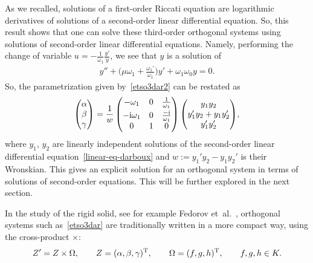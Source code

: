 \documentclass[10pt,a4paper]{amsart}
\numberwithin{equation}{section}
\begin{document}
\begin{Remark}\label{rmk-darboux-thm2}
As we recalled, solutions of a first-order Riccati equation are logarithmic derivatives of solutions of a second-order linear differential equation. So, this result shows that one can solve these third-order orthogonal systems using solutions of second-order linear differential equations.
Namely, performing the change of variable $u=-\frac{1}{\omega_1}\frac{y'}{y}$, we see that
$y$ is a solution of
\begin{gather}\label{linear-eq-darboux}
y''+\bigg( \mu \omega_1 + \frac{\omega_1'}{\omega_1}\bigg) y' + \omega_1 \omega_0 y = 0.
\end{gather}
So, the parametrization given by~\eqref{etso3dar2} can be restated as
\begin{gather*}
\begin{pmatrix}
\alpha \\ \beta \\ \gamma \end{pmatrix}	= \frac{1}{w}
\begin{pmatrix} - \omega_1 &0&{\frac {1}{\omega_{{1}}}}
\vspace{1mm}\\ -{\rm i}\omega_{{1}} &0&{\frac {-{\rm i}}{ \omega_{{1}} }}\\ 0&
1&0\end{pmatrix}
\begin{pmatrix} y_1y_2 \\ y_1'y_2+y_1y_2' \\ y_1'y_2'
\end{pmatrix}\!,
\end{gather*}
where $y_1$, $y_2$ are linearly independent solutions of the second-order linear differential equation~\eqref{linear-eq-darboux} and $w:=y_1'y_2-y_1y_2'$ is their Wronskian.
This gives an explicit solution for an orthogonal system in terms of solutions of second-order equations. This will be further explored in the next section.
\end{Remark}

In the study of the rigid solid, see for example Fedorov et~al.~\cite{femapr, femapr0}, orthogonal systems such as~\eqref{etso3dar} are traditionally written in a more compact way, using the cross-product $\times$:
\begin{gather}\label{fedo}
 Z'=Z \times \Omega,\qquad Z=(\alpha,\beta,\gamma)^{\rm T}, \qquad \Omega=(f,g,h)^{\rm T}, \qquad f,g,h\in K.
\end{gather}
\end{document}
